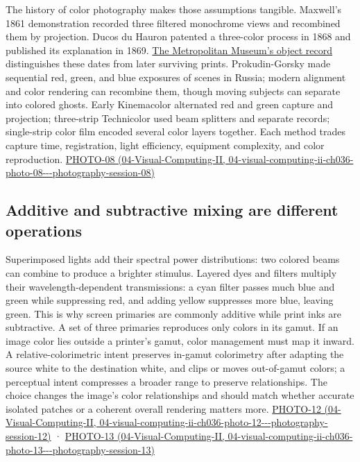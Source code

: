The history of color photography makes those assumptions tangible. Maxwell's 1861 demonstration recorded three filtered monochrome views and recombined them by projection. Ducos du Hauron patented a three-color process in 1868 and published its explanation in 1869. \href{https://www.metmuseum.org/art/collection/search/286318}{The Metropolitan Museum's object record} distinguishes these dates from later surviving prints. Prokudin-Gorsky made sequential red, green, and blue exposures of scenes in Russia; modern alignment and color rendering can recombine them, though moving subjects can separate into colored ghosts. Early Kinemacolor alternated red and green capture and projection; three-strip Technicolor used beam splitters and separate records; single-strip color film encoded several color layers together. Each method trades capture time, registration, light efficiency, equipment complexity, and color reproduction. \href{../04-Visual-Computing-II/main.pdf\#nameddest=04-visual-computing-ii-ch036-photo-08---photography-session-08}{PHOTO-08 (04-Visual-Computing-II, 04-visual-computing-ii-ch036-photo-08-\/-\/-photography-session-08)}

\subsection{Additive and subtractive mixing are different operations}\label{03-visual-computing-i-ch004-additive-and-subtractive-mixing-are-different-operations}

Superimposed lights add their spectral power distributions: two colored beams can combine to produce a brighter stimulus. Layered dyes and filters multiply their wavelength-dependent transmissions: a cyan filter passes much blue and green while suppressing red, and adding yellow suppresses more blue, leaving green. This is why screen primaries are commonly additive while print inks are subtractive. A set of three primaries reproduces only colors in its gamut. If an image color lies outside a printer's gamut, color management must map it inward. A relative-colorimetric intent preserves in-gamut colorimetry after adapting the source white to the destination white, and clips or moves out-of-gamut colors; a perceptual intent compresses a broader range to preserve relationships. The choice changes the image's color relationships and should match whether accurate isolated patches or a coherent overall rendering matters more. \href{../04-Visual-Computing-II/main.pdf\#nameddest=04-visual-computing-ii-ch036-photo-12---photography-session-12}{PHOTO-12 (04-Visual-Computing-II, 04-visual-computing-ii-ch036-photo-12-\/-\/-photography-session-12)} · \href{../04-Visual-Computing-II/main.pdf\#nameddest=04-visual-computing-ii-ch036-photo-13---photography-session-13}{PHOTO-13 (04-Visual-Computing-II, 04-visual-computing-ii-ch036-photo-13-\/-\/-photography-session-13)}

